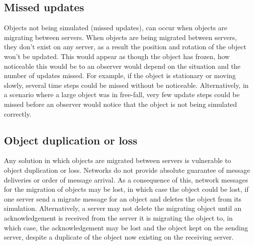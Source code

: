 \subsection{Missed updates}
Objects not being simulated (missed updates), can occur when objects are migrating between servers. When objects are being migrated between servers, they don't exist on any server, as a result the position and rotation of the object won't be updated. This would appear as though the object has frozen, how noticeable this would be to an observer would depend on the situation and the number of updates missed. For example, if the object is stationary or moving slowly, several time steps could be missed without be noticeable. Alternatively, in a scenario where a large object was in free-fall, very few update steps could be missed before an observer would notice that the object is not being simulated correctly.

\subsection{Object duplication or loss}
Any solution in which objects are migrated between servers is vulnerable to object duplication or loss. Networks do not provide absolute guarantee of message deliveries or order of message arrival. As a consequence of this, network messages for the migration of objects may be lost, in which case the object could be lost, if one server send a migrate message for an object and deletes the object from its simulation. Alternatively, a server may not delete the migrating object until an acknowledgement is received from the server it is migrating the object to, in which case, the acknowledgement may be lost and the object kept on the sending server, despite a duplicate of the object now existing on the receiving server. %



